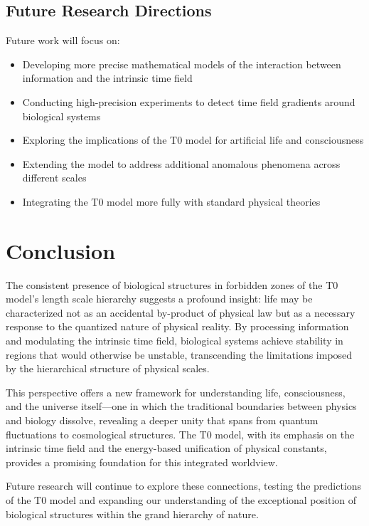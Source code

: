 \documentclass[12pt,a4paper]{article}
\begin{document}
	\subsection{Future Research Directions}
	\label{subsec:future_directions}
	
	Future work will focus on:
	
	\begin{itemize}
		\item Developing more precise mathematical models of the interaction between information and the intrinsic time field
		\item Conducting high-precision experiments to detect time field gradients around biological systems
		\item Exploring the implications of the T0 model for artificial life and consciousness
		\item Extending the model to address additional anomalous phenomena across different scales
		\item Integrating the T0 model more fully with standard physical theories
	\end{itemize}
	
	\section{Conclusion}
	\label{sec:conclusion}
	
	The consistent presence of biological structures in forbidden zones of the T0 model's length scale hierarchy suggests a profound insight: life may be characterized not as an accidental by-product of physical law but as a necessary response to the quantized nature of physical reality. By processing information and modulating the intrinsic time field, biological systems achieve stability in regions that would otherwise be unstable, transcending the limitations imposed by the hierarchical structure of physical scales.
	
	This perspective offers a new framework for understanding life, consciousness, and the universe itself—one in which the traditional boundaries between physics and biology dissolve, revealing a deeper unity that spans from quantum fluctuations to cosmological structures. The T0 model, with its emphasis on the intrinsic time field and the energy-based unification of physical constants, provides a promising foundation for this integrated worldview.
	
	Future research will continue to explore these connections, testing the predictions of the T0 model and expanding our understanding of the exceptional position of biological structures within the grand hierarchy of nature.
	
\end{document}
